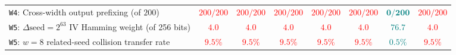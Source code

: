 \documentclass[10pt]{article}
\theoremstyle{definition}
\newcommand{\code}[1]{\texttt{#1}}
\begin{document}
\begin{table}[ht!]
{\begin{tabular}{@{}lccccccc@{}}
\code{W4}: Cross-width output prefixing (of $200$) & \textcolor{Red}{$200 / 200$} & \textcolor{Red}{$200 / 200$} & \textcolor{Red}{$200 / 200$} & \textcolor{Red}{$200 / 200$} & \textcolor{Red}{$200 / 200$} & \textcolor{Teal}{$\mathbf{0 / 200}$} & \textcolor{Red}{$200 / 200$} \\
\code{W5}: $\Delta\text{seed}=2^{63}$ IV Hamming weight (of 256 bits) & \textcolor{Red}{$4.0$} & \textcolor{Red}{$4.0$} & \textcolor{Red}{$4.0$} & \textcolor{Red}{$4.0$} & \textcolor{Red}{$4.0$} & \textcolor{Teal}{$\mathbf{76.7}$} & \textcolor{Red}{$4.0$} \\
\code{W5}: $w=8$ related-seed collision transfer rate & \textcolor{Red}{$9.5\%$} & \textcolor{Red}{$9.5\%$} & \textcolor{Red}{$9.5\%$} & \textcolor{Red}{$9.5\%$} & \textcolor{Red}{$9.5\%$} & \textcolor{Teal}{$\mathbf{0.5\%}$} & \textcolor{Red}{$9.5\%$} \\
\bottomrule
\end{tabular}%
}
\end{table}
\end{document}

